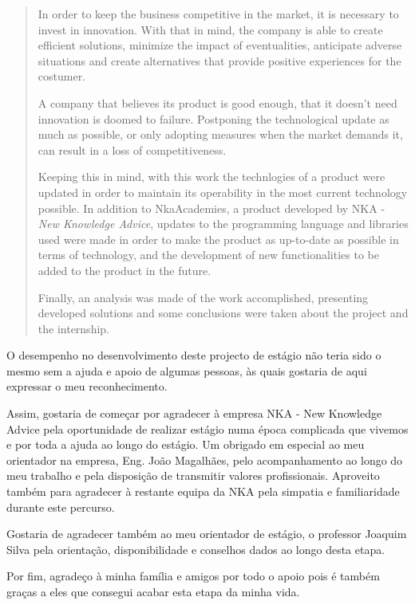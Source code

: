\documentclass[a4paper,12pt,twoside]{book}
\begin{document}
\begin{abstract}

\par In order to keep the business competitive in the market, it is necessary to invest in innovation. With that in mind, the company is able to create efficient solutions, minimize the impact of eventualities, anticipate adverse situations and create alternatives that provide positive experiences for the costumer.
\par A company that believes its product is good enough, that it doesn't need innovation is doomed to failure. Postponing the technological update as much as possible, or only adopting measures when the market demands it, can result in a loss of competitiveness.
\par Keeping this in mind, with this work the technlogies of a product were updated in order to maintain its operability in the most current technology possible. In addition to NkaAcademies, a product developed by NKA - \textit{New Knowledge Advice}, updates to the programming language and libraries used were made in order to make the product as up-to-date as possible in terms of technology, and the development of new functionalities to be added to the product in the future.
\par Finally, an analysis was made of the work accomplished, presenting developed solutions and some conclusions were taken about the project and the internship.
\end{abstract}

\begin{agradecimentos}
\par O desempenho no desenvolvimento deste projecto de estágio não teria sido o mesmo sem a ajuda e apoio de algumas pessoas, às quais gostaria de aqui expressar o meu reconhecimento.
\par Assim, gostaria de começar por agradecer à empresa NKA - New Knowledge Advice pela oportunidade de realizar estágio numa época complicada que vivemos e por toda a ajuda ao longo do estágio. Um obrigado em especial ao meu orientador na empresa, Eng. João Magalhães, pelo acompanhamento ao longo do meu trabalho e pela disposição de transmitir valores profissionais. Aproveito também para agradecer à restante equipa da NKA pela simpatia e familiaridade durante este percurso.
\par Gostaria de agradecer também ao meu orientador de estágio, o professor Joaquim Silva pela orientação, disponibilidade e conselhos dados ao longo desta etapa.
\par Por fim, agradeço à minha família e amigos por todo o apoio pois é também graças a eles que consegui acabar esta etapa da minha vida.
\end{agradecimentos}
\end{document}

